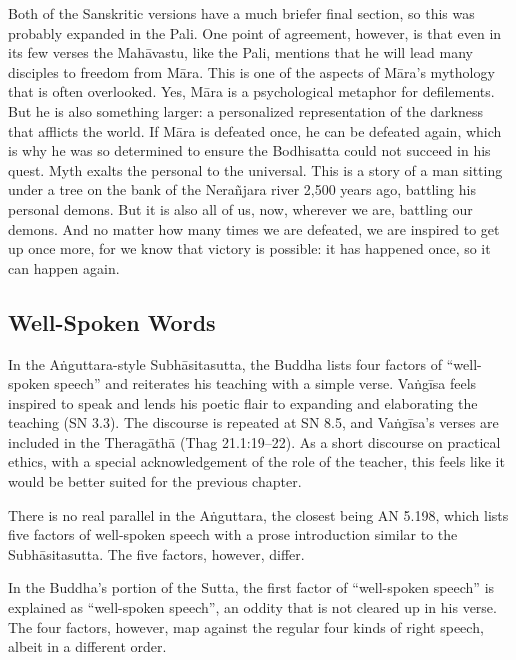 \documentclass[12pt,openany]{book}%
\begin{document}
Both of the Sanskritic versions have a much briefer final section, so this was probably expanded in the Pali. One point of agreement, however, is that even in its few verses the \textsanskrit{Mahāvastu}, like the Pali, mentions that he will lead many disciples to freedom from \textsanskrit{Māra}. This is one of the aspects of \textsanskrit{Māra}’s mythology that is often overlooked. Yes, \textsanskrit{Māra} is a psychological metaphor for defilements. But he is also something larger: a personalized representation of the darkness that afflicts the world. If \textsanskrit{Māra} is defeated once, he can be defeated again, which is why he was so determined to ensure the Bodhisatta could not succeed in his quest. Myth exalts the personal to the universal. This is a story of a man sitting under a tree on the bank of the \textsanskrit{Nerañjara} river 2,500 years ago, battling his personal demons. But it is also all of us, now, wherever we are, battling our demons. And no matter how many times we are defeated, we are inspired to get up once more, for we know that victory is possible: it has happened once, so it can happen again.

\subsection*{Well-Spoken Words}

In the \textsanskrit{Aṅguttara}-style \textsanskrit{Subhāsitasutta}, the Buddha lists four factors of “well-spoken speech” and reiterates his teaching with a simple verse. \textsanskrit{Vaṅgīsa} feels inspired to speak and lends his poetic flair to expanding and elaborating the teaching (SN 3.3). The discourse is repeated at SN 8.5, and \textsanskrit{Vaṅgīsa}’s verses are included in the \textsanskrit{Theragāthā} (Thag 21.1:19–22). As a short discourse on practical ethics, with a special acknowledgement of the role of the teacher, this feels like it would be better suited for the previous chapter.

There is no real parallel in the \textsanskrit{Aṅguttara}, the closest being AN 5.198, which lists five factors of well-spoken speech with a prose introduction similar to the \textsanskrit{Subhāsitasutta}. The five factors, however, differ.

In the Buddha’s portion of the Sutta, the first factor of “well-spoken speech” is explained as “well-spoken speech”, an oddity that is not cleared up in his verse. The four factors, however, map against the regular four kinds of right speech, albeit in a different order.
\end{document}
